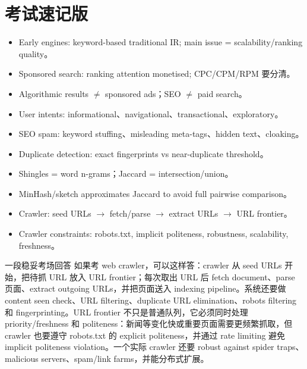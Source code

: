 \documentclass[11pt,a4paper]{ctexart}
\begin{document}
\section{考试速记版}
\begin{itemize}
\item Early engines: keyword-based traditional IR; main issue = scalability/ranking quality。
\item Sponsored search: ranking attention monetised; CPC/CPM/RPM 要分清。
\item Algorithmic results \(\neq\) sponsored ads；SEO \(\neq\) paid search。
\item User intents: informational、navigational、transactional、exploratory。
\item SEO spam: keyword stuffing、misleading meta-tags、hidden text、cloaking。
\item Duplicate detection: exact fingerprints vs near-duplicate threshold。
\item Shingles = word n-grams；Jaccard = intersection/union。
\item MinHash/sketch approximates Jaccard to avoid full pairwise comparison。
\item Crawler: seed URLs \(\rightarrow\) fetch/parse \(\rightarrow\) extract URLs \(\rightarrow\) URL frontier。
\item Crawler constraints: robots.txt, implicit politeness, robustness, scalability, freshness。
\end{itemize}
\begin{callout}{一段稳妥考场回答}
如果考 web crawler，可以这样答：crawler 从 seed URLs 开始，把待抓 URL 放入 URL frontier；每次取出 URL 后 fetch document、parse 页面、extract outgoing URLs，并把页面送入 indexing pipeline。系统还要做 content seen check、URL filtering、duplicate URL elimination、robots filtering 和 fingerprinting。URL frontier 不只是普通队列，它必须同时处理 priority/freshness 和 politeness：新闻等变化快或重要页面需要更频繁抓取，但 crawler 也要遵守 robots.txt 的 explicit politeness，并通过 rate limiting 避免 implicit politeness violation。一个实际 crawler 还要 robust against spider traps、malicious servers、spam/link farms，并能分布式扩展。
\end{callout}
\end{document}
